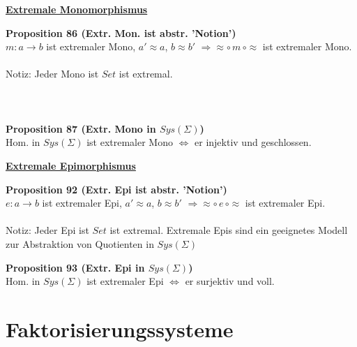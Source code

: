 %
\begin{multicols}{2}{}

\textbf{\underline{Extremale Monomorphismus}}

\textbf{Proposition 86 (Extr. Mon. ist abstr. 'Notion') } \\
$m: a \rightarrow b$ ist extremaler Mono, $a' \approx a$, $b \approx b'$ $\Rightarrow \approx \circ \, m \, \circ \approx$ ist extremaler Mono. 
\\
\\
Notiz: Jeder Mono ist $Set$ ist extremal.
\\
\\
\\
\\
\textbf{Proposition 87 (Extr. Mono in $Sys(\Sigma)$) } \\
Hom. in $Sys(\Sigma)$ ist extremaler Mono $\Leftrightarrow$  er injektiv und geschlossen.


\columnbreak
\textbf{\underline{Extremale Epimorphismus}}


\textbf{Proposition 92 (Extr. Epi ist abstr. 'Notion') } \\
$e: a \rightarrow b$ ist extremaler Epi, $a' \approx a$, $b \approx b'$ $\Rightarrow \approx \circ \, e \, \circ \approx$ ist extremaler Epi. 
\\
\\
Notiz: Jeder Epi ist $Set$ ist extremal. Extremale Epis sind ein geeignetes Modell zur Abstraktion von Quotienten in $Sys(\Sigma)$

\textbf{Proposition 93 (Extr. Epi in $Sys(\Sigma)$) } \\
Hom. in $Sys(\Sigma)$ ist extremaler Epi  $\Leftrightarrow$  er surjektiv und voll.
\end{multicols}

\section{Faktorisierungssysteme}



